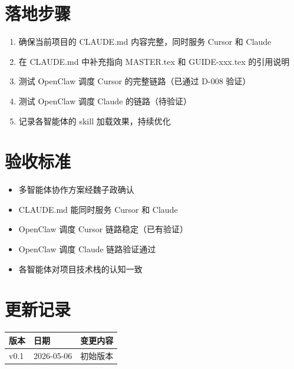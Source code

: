 \documentclass[11pt,a4paper]{article}
\begin{document}
\section{落地步骤}

\begin{enumerate}
  \item 确保当前项目的 CLAUDE.md 内容完整，同时服务 Cursor 和 Claude
  \item 在 CLAUDE.md 中补充指向 MASTER.tex 和 GUIDE-xxx.tex 的引用说明
  \item 测试 OpenClaw 调度 Cursor 的完整链路（已通过 D-008 验证）
  \item 测试 OpenClaw 调度 Claude 的链路（待验证）
  \item 记录各智能体的 skill 加载效果，持续优化
\end{enumerate}

\section{验收标准}

\begin{itemize}
  \item[$\square$] 多智能体协作方案经魏子政确认
  \item[$\square$] CLAUDE.md 能同时服务 Cursor 和 Claude
  \item[$\square$] OpenClaw 调度 Cursor 链路稳定（已有验证）
  \item[$\square$] OpenClaw 调度 Claude 链路验证通过
  \item[$\square$] 各智能体对项目技术栈的认知一致
\end{itemize}

\section*{更新记录}

\begin{tabular}{lll}
\toprule
版本 & 日期 & 变更内容 \\
\midrule
v0.1 & 2026-05-06 & 初始版本 \\
\bottomrule
\end{tabular}
\end{document}
